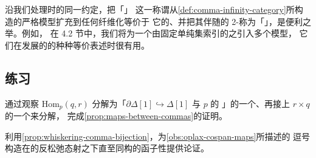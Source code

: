 沿我们处理\trArrowInfinityCategory{}时的同一约定，把「\trCommaInfinityCategory」%
这一称谓从\cref{def:comma-infinity-category}所构造的严格模型扩充到任何纤维化等价于%
它的\trInfinityCategory{}、并把其伴随的 2-\trCell{}称为「\trCommaCone」，是便利之举。例如，%
在 4.2 节中，我们将为一个由固定单纯集索引的\trDiagram{}之\trInfinityCategoryOfCones{}引入多个模型，%
它们在发展\trLimit{}的\trUniversalProperty{}的种种等价表述时很有用。

\subsection*{练习}

\begin{exercise}[命题 C.1.12]\label{ex:hom-p-factors}
通过观察 $\mathrm{Hom}_p(q,r)$ 分解为「$\partial\Delta[1]\hookrightarrow\Delta[1]$ 与 $p$ 的%
\trLeibnizCotensor」的一个\trPullback{}、再接上 $r\times q$ 的一个\trPullback{}来分解，%
完成\cref{prop:maps-between-commas}的证明。
\end{exercise}

\begin{exercise}\label{ex:oplax-functoriality}
利用\cref{prop:whiskering-comma-bijection}，为\cref{obs:oplax-cospan-maps}所描述的%
逗号构造在\trCospan{}的反松弛态射之下直至同构的函子性提供论证。
\end{exercise}

